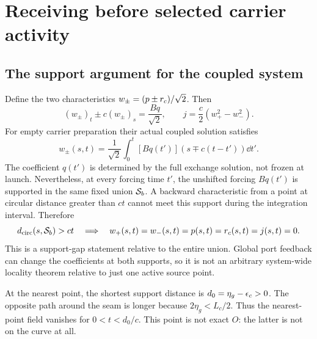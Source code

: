 \section{Receiving before selected carrier activity}\label{sec:launch}
\subsection{The support argument for the coupled system}\label{sec:supportargument}
Define the two characteristics $w_\pm=(p\pm r_c)/\sqrt2$. Then
\begin{equation}\label{eq:characteristics}
 (w_\pm)_t\pm c(w_\pm)_s=\frac{Bq}{\sqrt2},\qquad
 j=\frac c2(w_+^2-w_-^2).
\end{equation}
For empty carrier preparation their actual coupled solution satisfies
\begin{equation}\label{eq:duhamel}
 w_\pm(s,t)=\frac1{\sqrt2}\int_0^t
 [Bq(t')](s\mp c(t-t'))\dd t'.
\end{equation}
The coefficient $q(t')$ is determined by the full exchange solution, not frozen at launch. Nevertheless, at every forcing time $t'$, the unshifted forcing $Bq(t')$ is supported in the same fixed union $\mathcal S_b$. A backward characteristic from a point at circular distance greater than $ct$ cannot meet this support during the integration interval. Therefore
\begin{equation}\label{eq:gapzero}
 d_{\rm circ}(s,\mathcal S_b)>ct\quad\Longrightarrow\quad
 w_+(s,t)=w_-(s,t)=p(s,t)=r_c(s,t)=j(s,t)=0.
\end{equation}
This is a support-gap statement relative to the entire union. Global port feedback can change the coefficients at both supports, so it is not an arbitrary system-wide locality theorem relative to just one active source point.

At the nearest point, the shortest support distance is $d_0=\eta_g-\epsilon_c>0$. The opposite path around the seam is longer because $2\eta_g<L_c/2$. Thus the nearest-point field vanishes for $0<t<d_0/c$. This point is not exact $O$: the latter is not on the curve at all.


